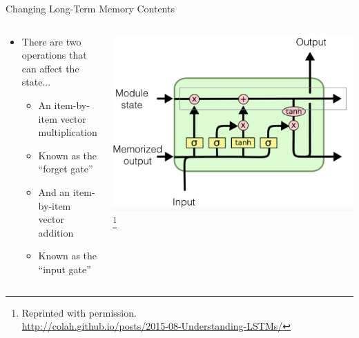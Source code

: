 \documentclass[aspectratio=169]{beamer}
\begin{document}
\begin{frame}{Changing Long-Term Memory Contents}

\begin{columns}
\begin{column}{0.6\textwidth}
\begin{itemize}
	\item There are two operations that can affect the state...
	\begin{itemize}
	\item An item-by-item vector multiplication
	\item Known as the ``forget gate''
	\item And an item-by-item vector addition
	\item Known as the ``input gate''
	\end{itemize}
\end{itemize}
\end{column}
\begin{column}{0.4\textwidth}
\includegraphics[width=1\textwidth]{lectLSTM/highway.png}
\footnote{Reprinted with permission.\\ \hspace{1.7em}\url{http://colah.github.io/posts/2015-08-Understanding-LSTMs/}}
\end{column}
\end{columns}
\end{frame}
\end{document}
